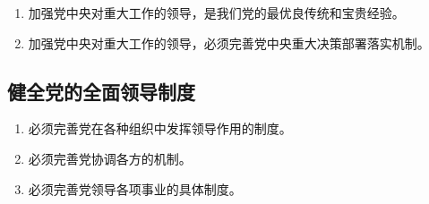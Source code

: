 \documentclass[UTF8,10pt]{ctexbook} %
\begin{document}
\begin{enumerate}[itemsep=0pt]
    \item 加强党中央对重大工作的领导，是我们党的最优良传统和宝贵经验。
    \item 加强党中央对重大工作的领导，必须完善党中央重大决策部署落实机制。
\end{enumerate}


\subsection{健全党的全面领导制度}


\begin{enumerate}[itemsep=0pt]
    \item 必须完善党在各种组织中发挥领导作用的制度。
    \item 必须完善党协调各方的机制。
    \item 必须完善党领导各项事业的具体制度。
\end{enumerate}












\end{document}
